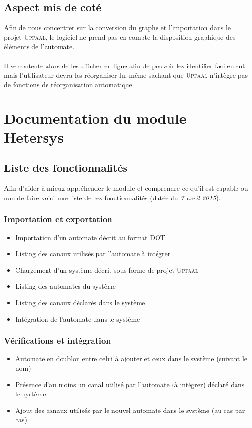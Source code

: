 \documentclass[12pt,a4paper]{report}
\begin{document}
\subsection*{Aspect mis de coté}
Afin de nous concentrer sur la conversion du graphe et l'importation dans le projet \textsc{Uppaal},
le logiciel ne prend pas en compte la disposition graphique des éléments de l'automate.
\\\\
Il se contente alors de les afficher en ligne afin de pouvoir les identifier facilement mais 
l'utilisateur devra les réorganiser lui-même sachant que \textsc{Uppaal} n'intègre pas de fonctions de 
réorganisation automatique

\section{Documentation du module Hetersys}
\subsection{Liste des fonctionnalités}
Afin d'aider à mieux appréhender le module et comprendre ce qu'il est capable ou non de faire voici
une liste de ces fonctionnalités (datée du \textit{7 avril 2015}).

\subsubsection*{Importation et exportation}
\begin{itemize}
	\item Importation d'un automate décrit au format DOT
	\item Listing des canaux utilisés par l'automate à intégrer	
	\item Chargement d'un système décrit sous forme de projet \textsc{Uppaal}
	\item Listing des automates du système
	\item Listing des canaux déclarés dans le système
	\item Intégration de l'automate dans le système
\end{itemize}

\subsubsection*{Vérifications et intégration}\label{ssec:VerifList}
\begin{itemize}
	\item Automate en doublon entre celui à ajouter et ceux dans le système (suivant le nom)
	\item Présence d'au moins un canal utilisé par l'automate (à intégrer) déclaré dans le système
	\item Ajout des canaux utilisés par le nouvel automate dans le système (au cas par cas)
\end{itemize}
\end{document}
